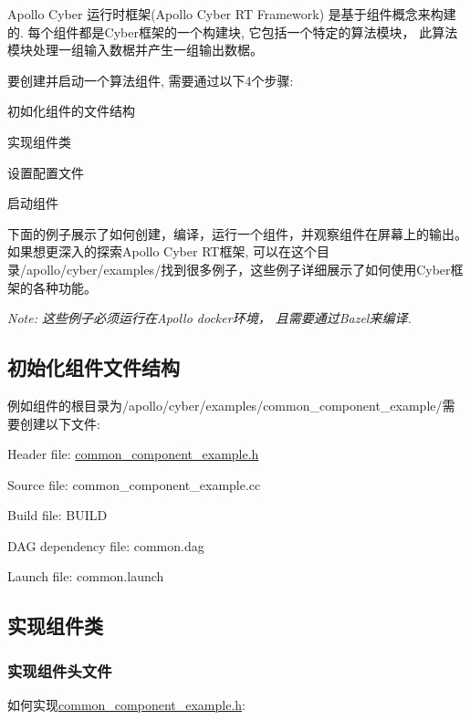 Apollo Cyber 运行时框架(\-Apollo Cyber R\-T Framework) 是基于组件概念来构建的. 每个组件都是\-Cyber框架的一个构建块, 它包括一个特定的算法模块， 此算法模块处理一组输入数椐并产生一组输出数椐。

要创建并启动一个算法组件, 需要通过以下4个步骤\-:


\begin{DoxyItemize}
\item 初如化组件的文件结构
\item 实现组件类
\item 设置配置文件
\item 启动组件
\end{DoxyItemize}

下面的例子展示了如何创建，编译，运行一个组件，并观察组件在屏幕上的输出。 如果想更深入的探索\-Apollo Cyber R\-T框架, 可以在这个目录{\ttfamily /apollo/cyber/examples/}找到很多例子，这些例子详细展示了如何使用\-Cyber框架的各种功能。

{\itshape Note\-: 这些例子必须运行在\-Apollo docker环境， 且需要通过\-Bazel来编译.}

\subsection*{初始化组件文件结构}

例如组件的根目录为{\ttfamily /apollo/cyber/examples/common\-\_\-component\-\_\-example/}需要创建以下文件\-:


\begin{DoxyItemize}
\item Header file\-: \hyperlink{common__component__example_8h}{common\-\_\-component\-\_\-example.\-h}
\item Source file\-: common\-\_\-component\-\_\-example.\-cc
\item Build file\-: B\-U\-I\-L\-D
\item D\-A\-G dependency file\-: common.\-dag
\item Launch file\-: common.\-launch
\end{DoxyItemize}

\subsection*{实现组件类}

\subsubsection*{实现组件头文件}

如何实现{\ttfamily \hyperlink{common__component__example_8h}{common\-\_\-component\-\_\-example.\-h}}\-:


